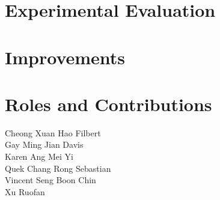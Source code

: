 \documentclass[letterpaper]{article}
\begin{document}
\section{Experimental Evaluation}

\section{Improvements}

\section{Roles and Contributions}
\begin{description}
\item [Cheong Xuan Hao Filbert]
\item [Gay Ming Jian Davis]
\item [Karen Ang Mei Yi]
\item [Quek Chang Rong Sebastian]
\item [Vincent Seng Boon Chin]
\item [Xu Ruofan]
\end{description}



\end{document}
